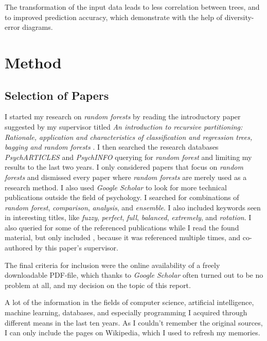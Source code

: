 \documentclass[a4paper,man,12pt,apacite]{apa6} %
\begin{document}
The transformation of the input data leads to less correlation between trees,
and to improved prediction accuracy, which \cite{rodriguez2006rotation}
demonstrate with the help of diversity-error diagrams.


\section{Method}

\subsection{Selection of Papers}
I started my research on \emph{random forests} by reading the
introductory paper suggested by my supervisor titled
\emph{An introduction to recursive partitioning: Rationale, application
and characteristics of classification and regression trees, bagging and
random forests} \cite{strobl2009introduction}.
I then searched the research databases \emph{PsychARTICLES} and
\emph{PsychINFO} querying for \emph{random forest} and limiting my results
to the last two years.
I only considered papers that focus on \emph{random forests} and
dismissed every paper where \emph{random forests} are merely used as a
research method.
I also used \emph{Google Scholar} to look for more technical
publications outside the field of psychology.
I searched for combinations of \emph{random forest}, \emph{comparison},
\emph{analysis}, and \emph{ensemble}.
I also included keywords seen in interesting titles, like \emph{fuzzy},
\emph{perfect}, \emph{full}, \emph{balanced}, \emph{extremely}, and
\emph{rotation}.
I also queried for some of the referenced publications while I read the
found material, but only included \cite{strobl2008conditional}, because
it was referenced multiple times, and co-authored by this paper's
supervisor.

The final criteria for inclusion were the online availability of a freely
downloadable PDF-file, which thanks to \emph{Google Scholar} often turned
out to be no problem at all, and my decision on the topic of
this report.

A lot of the information in the fields of computer science, artificial
intelligence, machine learning, databases, and especially programming
I acquired through different means in the last ten years.
As I couldn't remember the original sources, I can only include the pages
on Wikipedia, which I used to refresh my memories.
\end{document}
